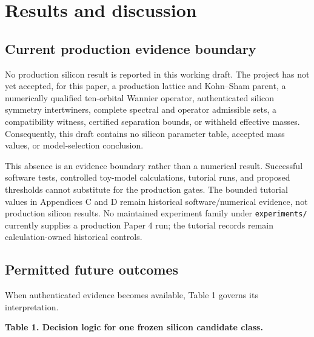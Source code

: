 \documentclass[11pt]{article}
\newenvironment{prospective}{\color{prospectivered}}{}
\begin{document}
\begin{prospective}
\section{Results and discussion}
\subsection{Current production evidence boundary}
No production silicon result is reported in this working draft. The project has not yet accepted, for this paper, a production lattice and Kohn–Sham parent, a numerically qualified ten-orbital Wannier operator, authenticated silicon symmetry intertwiners, complete spectral and operator admissible sets, a compatibility witness, certified separation bounds, or withheld effective masses. Consequently, this draft contains no silicon parameter table, accepted mass values, or model-selection conclusion.

This absence is an evidence boundary rather than a numerical result. Successful software tests, controlled toy-model calculations, tutorial runs, and proposed thresholds cannot substitute for the production gates. The bounded tutorial values in Appendices C and D remain historical software/numerical evidence, not production silicon results. No maintained experiment family under \texttt{experiments/} currently
supplies a production Paper 4 run; the tutorial records remain calculation-owned
historical controls.

\subsection{Permitted future outcomes}
When authenticated evidence becomes available, Table 1 governs its interpretation.

\textbf{Table 1. Decision logic for one frozen silicon candidate class.}


\end{prospective}
\end{document}
